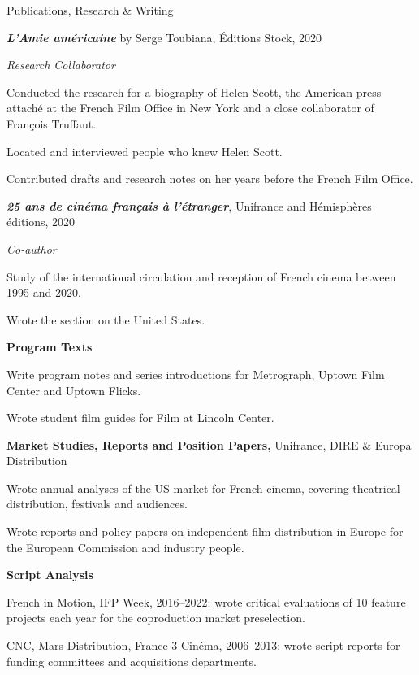 \begin{rubric}{Publications, Research \& Writing}

\entry*[2018--2019]%
\textbf{\textit{L'Amie am\'ericaine}} by Serge Toubiana, \'Editions Stock, 2020
\par
\textit{Research Collaborator}
\par
\begin{cvitems}
  \item Conducted the research for a biography of Helen Scott, the American press attach\'e
  at the French Film Office in New York and a close collaborator of Fran\c{c}ois Truffaut.
  \item Located and interviewed people who knew Helen Scott.
  \item Contributed drafts and research notes on her years before the French Film Office.
\end{cvitems}

\entry*[2020]%
\textbf{\textit{25 ans de cin\'ema fran\c{c}ais \`a l'\'etranger}}, Unifrance and
H\'emisph\`eres \'editions, 2020
\par
\textit{Co-author}
\par
\begin{cvitems}
  \item Study of the international circulation and reception of French cinema between 1995 and 2020.
  \item Wrote the section on the United States.
\end{cvitems}

\entry*[2016--present]%
\textbf{Program Texts}
\par
\begin{cvitems}
  \item Write program notes and series introductions for Metrograph, Uptown Film Center and
  Uptown Flicks.
  \item Wrote student film guides for Film at Lincoln Center.
\end{cvitems}

\entry*[2006--2024]%
\textbf{Market Studies, Reports and Position Papers,} Unifrance, DIRE \& Europa Distribution
\par
\begin{cvitems}
  \item Wrote annual analyses of the US market for French cinema, covering theatrical
  distribution, festivals and audiences.
  \item Wrote reports and policy papers on independent film distribution in Europe for the
  European Commission and industry people.
\end{cvitems}

\entry*[2006--2022]%
\textbf{Script Analysis}
\par
\begin{cvitems}
  \item French in Motion, IFP Week, 2016--2022: wrote critical evaluations of 10 feature
  projects each year for the coproduction market preselection.
  \item CNC, Mars Distribution, France 3 Cin\'ema, 2006--2013: wrote script reports for
  funding committees and acquisitions departments.
\end{cvitems}

\end{rubric}
